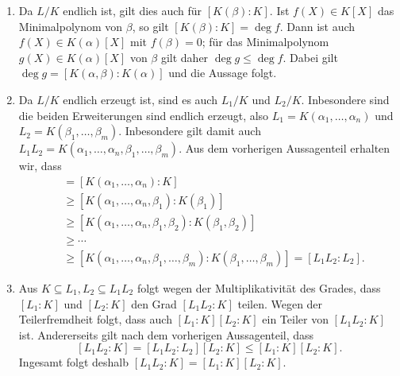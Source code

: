 \begin{solution}
  \begin{enumerate}
    \item
      Da $L/K$ endlich ist, gilt dies auch für $[K(\beta) : K]$.
      Ist $f(X) \in K[X]$ das Minimalpolynom von $\beta$, so gilt $[K(\beta) : K] = \deg f$.
      Dann ist auch $f(X) \in K(\alpha)[X]$ mit $f(\beta) = 0$;
      für das Minimalpolynom $g(X) \in K(\alpha)[X]$ von $\beta$ gilt daher $\deg g \leq \deg f$.
      Dabei gilt $\deg g = [K(\alpha, \beta) : K(\alpha)]$ und die Aussage folgt.
    
    \item
      Da $L/K$ endlich erzeugt ist, sind es auch $L_1/K$ und $L_2/K$.
      Inbesondere sind die beiden Erweiterungen sind endlich erzeugt, also $L_1 = K(\alpha_1, \dotsc, \alpha_n)$ und $L_2 = K(\beta_1, \dotsc, \beta_m)$.
      Inbesondere gilt damit auch $L_1 L_2 = K(\alpha_1, \dotsc, \alpha_n, \beta_1, \dotsc, \beta_m)$.
      Aus dem vorherigen Aussagenteil erhalten wir, dass
      \begin{align*}
              [L_1 : K]
       &=     [K(\alpha_1, \dotsc, \alpha_n) : K]
       \\
       &\geq  [K(\alpha_1, \dotsc, \alpha_n, \beta_1) : K(\beta_1)]
       \\
       &\geq  [K(\alpha_1, \dotsc, \alpha_n, \beta_1, \beta_2) : K(\beta_1, \beta_2)]
       \\
       &\geq  \dotsb
       \\
       &\geq  [K(\alpha_1, \dotsc, \alpha_n, \beta_1, \dotsc, \beta_m) : K(\beta_1, \dotsc, \beta_m)]
        =  [L_1 L_2 : L_2].
      \end{align*}
    
    \item
      Aus $K \subseteq L_1, L_2 \subseteq L_1 L_2$ folgt wegen der Multiplikativität des Grades, dass $[L_1 : K]$ und $[L_2 : K]$ den Grad $[L_1 L_2 : K]$ teilen.
      Wegen der Teilerfremdheit folgt, dass auch $[L_1 : K] [L_2 : K]$ ein Teiler von $[L_1 L_2 : K]$ ist.
      Andererseits gilt nach dem vorherigen Aussagenteil, dass
      \[
              [L_1 L_2 : K]
        =     [L_1 L_2 : L_2] [L_2 : K]
        \leq  [L_1 : K] [L_2 : K].
      \]
      Ingesamt folgt deshalb $[L_1 L_2 : K] = [L_1 : K][L_2 : K]$.
  \end{enumerate}
\end{solution}


